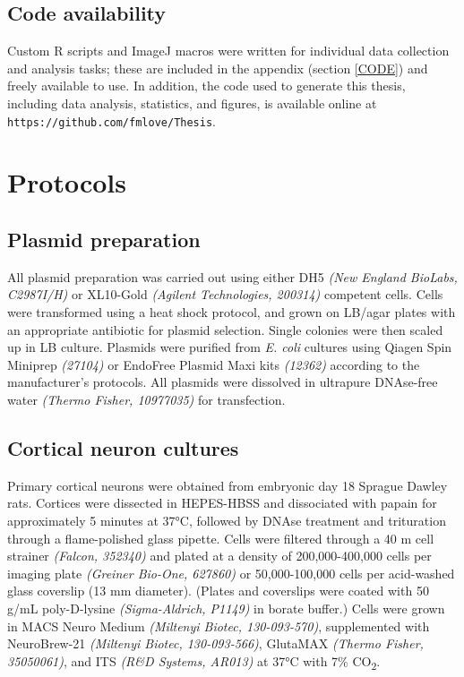 \documentclass[
  12pt,
  a4paper,
]{book}
\begin{document}
\hypertarget{code-availability}{%
\subsection{Code availability}\label{code-availability}}

Custom R scripts and ImageJ macros were written for individual data collection and analysis tasks; these are included in the appendix (section \ref{CODE}) and freely available to use. In addition, the code used to generate this thesis, including data analysis, statistics, and figures, is available online at \texttt{https://github.com/fmlove/Thesis}.

\hypertarget{protocols}{%
\section{Protocols}\label{protocols}}

\hypertarget{plasmid-prep}{%
\subsection{Plasmid preparation}\label{plasmid-prep}}

All plasmid preparation was carried out using either DH5\textalpha{} \emph{(New England BioLabs, C2987I/H)} or XL10-Gold \emph{(Agilent Technologies, 200314)} competent cells. Cells were transformed using a heat shock protocol, and grown on LB/agar plates with an appropriate antibiotic for plasmid selection. Single colonies were then scaled up in LB culture. Plasmids were purified from \emph{E. coli} cultures using Qiagen Spin Miniprep \emph{(27104)} or EndoFree Plasmid Maxi kits \emph{(12362)} according to the manufacturer's protocols. All plasmids were dissolved in ultrapure DNAse-free water \emph{(Thermo Fisher, 10977035)} for transfection.

\hypertarget{CNC}{%
\subsection{Cortical neuron cultures}\label{CNC}}

Primary cortical neurons were obtained from embryonic day 18 Sprague Dawley rats. Cortices were dissected in HEPES-HBSS and dissociated with papain for approximately 5 minutes at 37°C, followed by DNAse treatment and trituration through a flame-polished glass pipette. Cells were filtered through a 40 \textmu{}m cell strainer \emph{(Falcon, 352340)} and plated at a density of 200,000-400,000 cells per imaging plate \emph{(Greiner Bio-One, 627860)} or 50,000-100,000 cells per acid-washed glass coverslip (13 mm diameter). (Plates and coverslips were coated with 50 \textmu{}g/mL poly-D-lysine \emph{(Sigma-Aldrich, P1149)} in borate buffer.) Cells were grown in MACS Neuro Medium \emph{(Miltenyi Biotec, 130-093-570)}, supplemented with NeuroBrew-21 \emph{(Miltenyi Biotec, 130-093-566)}, GlutaMAX \emph{(Thermo Fisher, 35050061)}, and ITS \emph{(R\&D Systems, AR013)} at 37°C with 7\% CO\textsubscript{2}.
\end{document}
